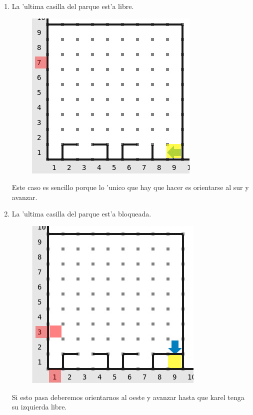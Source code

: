 \documentclass{article}
\begin{document}
    \begin{enumerate}
    	\item La 'ultima casilla del parque est'a libre.
            \begin{figure}[H]
                \centering
                \includegraphics[scale=0.5]{ultima_libre}
            \end{figure}

            Este caso es sencillo porque lo 'unico que hay que hacer es orientarse al sur y avanzar.
    		
    	\item La 'ultima casilla del parque est'a bloqueada.
            \begin{figure}[H]
                \centering
                \includegraphics[scale=0.5]{ultima_bloqueada}
            \end{figure}

            Si esto pasa deberemos orientarnos al oeste y avanzar hasta que karel tenga su izquierda libre.


\end{enumerate}
\end{document}

